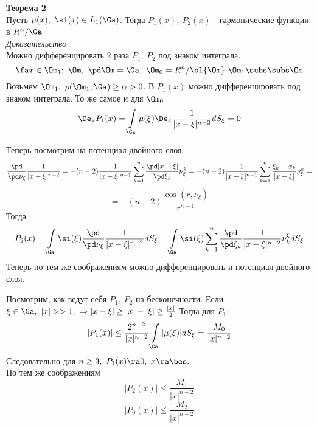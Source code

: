 \documentclass[a4paper,draft]{article}
\begin{document}
\textbf{Теорема 2}\\
Пусть $\mu(x),\ \si(x)\in L_1(\Ga)$. Тогда $P_1(x),\ P_2(x)$ - гармонические функции
в $R^n/\Ga$\\
\textit{Доказательство}\\
Можно дифференцировать 2 раза $P_1,\ P_2$ под знаком интеграла.
$$
\fa x\in\Om_1;\ \Om,\ \pd \Om=\Ga,\ \Om_0=R^n/\ol{\Om}\
\Om_1\subs\subs\Om
$$
Возьмем $\Om_1,\ \rho(\Om_1,\Ga)\ge\alpha>0$.
В $P_1(x)$ можно дифференцировать под знаком интеграла. То же самое и для $\Om_0$
$$
\De_{x}P_1(x)=\int\limits_{\Ga}\mu(\xi)\De_x\frac{1}{|x-\xi|^{n-2}}dS_\xi=0
$$

Теперь посмотрим на потенциал двойного слоя
$$
\frac{\pd}{\pd\nu_\xi}\frac{1}{|x-\xi|^{n-2}}=
-(n-2)\frac{1}{|x-\xi|^{n-1}}\sum\limits_{k=1}^n\frac{\pd |x-\xi|}{\pd\xi_k}\nu_\xi^k=
-(n-2)\frac{1}{|x-\xi|^{n-1}}\sum\limits_{k=1}^n\frac{\xi_k-x_k}{|x-\xi|}\nu_\xi^k=
$$
$$
=-(n-2)\frac{\cos{(r,\nu_\xi)}}{r^{n-1}}
$$
Тогда
$$
P_2(x)=\int\limits_\Ga\si(\xi)\frac{\pd}{\pd\nu_\xi}\frac{1}{|x-\xi|^{n-2}}dS_\xi=
\int\limits_\Ga\si(\xi)
\sum\limits_{k=1}^n
\frac{\pd}{\pd\xi_k}\frac{1}{|x-\xi|^{n-2}}\nu_k^\xi dS_\xi
$$
Теперь по тем же соображениям можно дифференцировать и потенциал двойного слоя.


Посмотрим, как ведут себя $P_1,\ P_2$ на бесконечности.
Если $\xi\in\Ga,\ |x|>>1,\ \Rightarrow |x-\xi|\ge |x|-|\xi|\ge\frac{|x|}{2}$
Тогда для $P_1$:
$$
|P_1(x)|\le\frac{2^{n-2}}{|x|^{n-2}}\int\limits_\Ga |\mu(\xi)|dS_\xi=\frac{M_0}{|x|^{n-2}}
$$
Следовательно для $n\ge 3,\ P_1(x)\ra 0,\ x\ra\bes.$\\
По тем же соображениям
$$
|P_2(x)|\le\frac{M_1}{|x|^{n-2}}
$$
$$
|P_0(x)|\le\frac{M_2}{|x|^{n-2}}
$$
\end{document}
